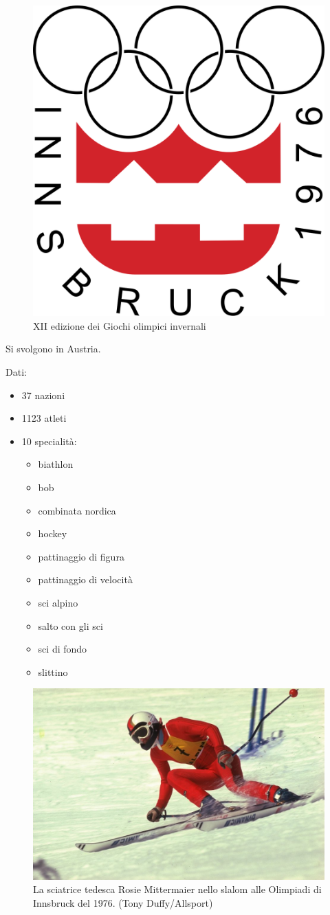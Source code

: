 \documentclass[
]{book}
\providecommand{\tightlist}{%
  \setlength{\itemsep}{0pt}\setlength{\parskip}{0pt}}
\begin{document}
\begin{figure}
\includegraphics[width=0.4\linewidth]{images/loghi/1976} \caption{XII edizione dei Giochi olimpici invernali}\label{fig:unnamed-chunk-37}
\end{figure}

Si svolgono in Austria.

Dati:

\begin{itemize}
\tightlist
\item
  37 nazioni
\item
  1123 atleti
\item
  10 specialità:

  \begin{itemize}
  \tightlist
  \item
    biathlon
  \item
    bob
  \item
    combinata nordica
  \item
    hockey
  \item
    pattinaggio di figura
  \item
    pattinaggio di velocità
  \item
    sci alpino
  \item
    salto con gli sci
  \item
    sci di fondo
  \item
    slittino
  \end{itemize}
\end{itemize}

\begin{figure}
\includegraphics[width=0.8\linewidth]{images/IlPost/1976} \caption{La sciatrice tedesca Rosie Mittermaier nello slalom alle Olimpiadi di Innsbruck del 1976. (Tony Duffy/Allsport)}\label{fig:unnamed-chunk-38}
\end{figure}
\end{document}
